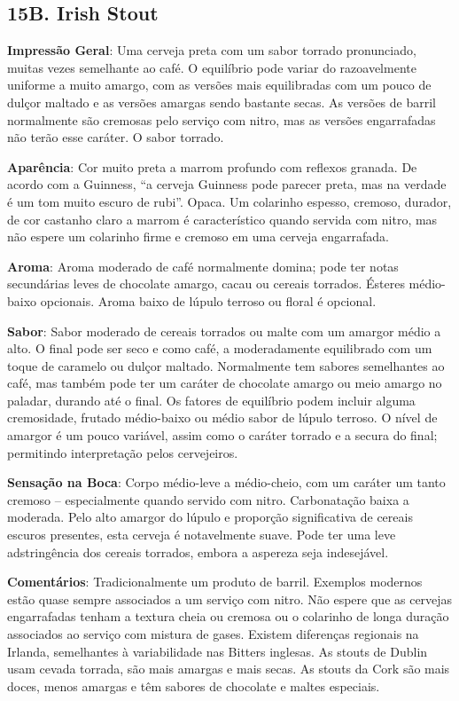\subsection*{15B. Irish Stout}
\textbf{Impressão Geral}: Uma cerveja preta com um sabor torrado pronunciado, muitas vezes semelhante ao café. O equilíbrio pode variar do razoavelmente uniforme a muito amargo, com as versões mais equilibradas com um pouco de dulçor maltado e as versões amargas sendo bastante secas. As versões de barril normalmente são cremosas pelo serviço com nitro, mas as versões engarrafadas não terão esse caráter. O sabor torrado.

\textbf{Aparência}: Cor muito preta a marrom profundo com reflexos granada. De acordo com a Guinness, “a cerveja Guinness pode parecer preta, mas na verdade é um tom muito escuro de rubi”. Opaca. Um colarinho espesso, cremoso, durador, de cor castanho claro a marrom é característico quando servida com nitro, mas não espere um colarinho firme e cremoso em uma cerveja engarrafada.

\textbf{Aroma}: Aroma moderado de café normalmente domina; pode ter notas secundárias leves de chocolate amargo, cacau ou cereais torrados. Ésteres médio-baixo opcionais. Aroma baixo de lúpulo terroso ou floral é opcional.

\textbf{Sabor}: Sabor moderado de cereais torrados ou malte com um amargor médio a alto. O final pode ser seco e como café, a moderadamente equilibrado com um toque de caramelo ou dulçor maltado. Normalmente tem sabores semelhantes ao café, mas também pode ter um caráter de chocolate amargo ou meio amargo no paladar, durando até o final. Os fatores de equilíbrio podem incluir alguma cremosidade, frutado médio-baixo ou médio sabor de lúpulo terroso. O nível de amargor é um pouco variável, assim como o caráter torrado e a secura do final; permitindo interpretação pelos cervejeiros.

\textbf{Sensação na Boca}: Corpo médio-leve a médio-cheio, com um caráter um tanto cremoso – especialmente quando servido com nitro. Carbonatação baixa a moderada. Pelo alto amargor do lúpulo e proporção significativa de cereais escuros presentes, esta cerveja é notavelmente suave. Pode ter uma leve adstringência dos cereais torrados, embora a aspereza seja indesejável.

\textbf{Comentários}: Tradicionalmente um produto de barril. Exemplos modernos estão quase sempre associados a um serviço com nitro. Não espere que as cervejas engarrafadas tenham a textura cheia ou cremosa ou o colarinho de longa duração associados ao serviço com mistura de gases. Existem diferenças regionais na Irlanda, semelhantes à variabilidade nas Bitters inglesas. As stouts de Dublin usam cevada torrada, são mais amargas e mais secas. As stouts da Cork são mais doces, menos amargas e têm sabores de chocolate e maltes especiais.

